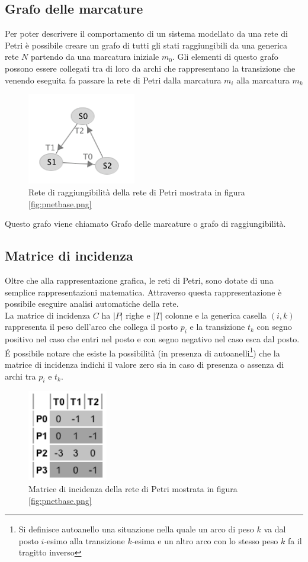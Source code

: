 \documentclass[italian,12pt]{book}
\begin{document}
\subsection{Grafo delle marcature}
Per poter descrivere il comportamento di un sistema modellato da una
rete di Petri è possibile creare un grafo di tutti gli stati
raggiungibili da una generica rete $N$ partendo da una marcatura
iniziale $m_0$. Gli elementi di questo grafo possono essere collegati
tra di loro da archi che rappresentano la transizione che venendo
eseguita fa passare la rete di Petri dalla marcatura $m_i$ alla
marcatura $m_k$
\begin{figure}[htb]
\centerline{\includegraphics[height=4cm]{img/reach_grap.png}}
\caption{Rete di raggiungibilità della rete di Petri mostrata in
  figura \ref{fig:pnetbase.png}}\label{fig:reach_grap_pnetbase.png}
\end{figure}
Questo grafo viene chiamato Grafo delle marcature o grafo di
raggiungibilità.

\subsection{Matrice di incidenza}
Oltre che alla rappresentazione grafica, le reti di Petri, sono dotate
di una semplice rappresentazioni matematica. Attraverso questa
rappresentazione è possibile eseguire analisi automatiche della
rete. \\
La matrice di incidenza $C$ ha $|P|$ righe e $|T|$ colonne e la
generica casella $(i, k)$ rappresenta il peso dell'arco che collega il
posto $p_i$ e la transizione $t_k$ con segno positivo nel caso che
entri nel posto e con segno negativo nel caso esca dal posto. \\
\'E possibile notare che esiste la possibilità (in presenza di
autoanelli\footnote{Si definisce autoanello una situazione nella quale
  un arco di peso $k$ va dal posto $i$-esimo alla transizione $k$-esima e un altro
  arco con lo stesso peso $k$ fa il tragitto inverso}) che la matrice
di incidenza indichi il valore zero sia in caso di presenza o assenza
di archi tra $p_i$ e $t_k$.
\begin{figure}[htb]
\centerline{\includegraphics[height=4cm]{img/incid_matrix.png}}
\caption{Matrice di incidenza della rete di Petri mostrata in
  figura \ref{fig:pnetbase.png}}\label{fig:incid_matrix_pnetbase.png}
\end{figure}
\end{document}
